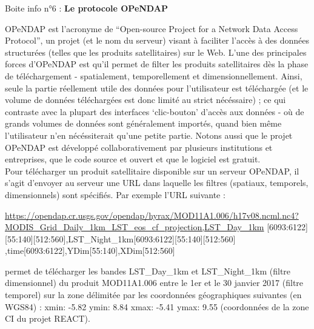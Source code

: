 \documentclass[12pt,twoside]{reedthesis}
\begin{document}
\begin{lightcyanbox}
\begin{center}
Boite info n°6 : \textbf{Le protocole OPeNDAP}

\end{center}
OPeNDAP est l'acronyme de ``Open-source Project for a Network Data Access Protocol'', un projet (et le nom du serveur) visant à faciliter l'accès à des données structurées (telles que les produits satellitaires) sur le Web. L'une des principales forces d'OPeNDAP est qu'il permet de filter les produits satellitaires dès la phase de téléchargement - spatialement, temporellement et dimensionnellement. Ainsi, seule la partie réellement utile des données pour l'utilisateur est téléchargée (et le volume de données téléchargées est donc limité au strict nécéssaire) ; ce qui contraste avec la plupart des interfaces `clic-bouton' d'accès aux données - où de grands volumes de données sont généralement importés, quand bien même l'utilisateur n'en nécéssiterait qu'une petite partie. Notons aussi que le projet OPeNDAP est développé collaborativement par plusieurs institutions et entreprises, que le code source et ouvert et que le logiciel est gratuit.\\

Pour télécharger un produit satellitaire disponible sur un serveur OPeNDAP, il s'agit d'envoyer au serveur une URL dans laquelle les filtres (spatiaux, temporels, dimensionnels) sont spécifiés. Par exemple l'URL suivante :

\url{https://opendap.cr.usgs.gov/opendap/hyrax/MOD11A1.006/h17v08.ncml.nc4?MODIS_Grid_Daily_1km_LST_eos_cf_projection,LST_Day_1km} {[}6093:6122{]}{[}55:140{]}{[}512:560{]},LST\_Night\_1km{[}6093:6122{]}{[}55:140{]}{[}512:560{]} ,time{[}6093:6122{]},YDim{[}55:140{]},XDim{[}512:560{]}

permet de télécharger les bandes LST\_Day\_1km et LST\_Night\_1km (filtre dimensionnel) du produit MOD11A1.006 entre le 1er et le 30 janvier 2017 (filtre temporel) sur la zone délimitée par les coordonnées géographiques suivantes (en WGS84) : xmin: -5.82 ymin: 8.84 xmax: -5.41 ymax: 9.55 (coordonnées de la zone CI du projet REACT).

\end{lightcyanbox}
\end{document}
